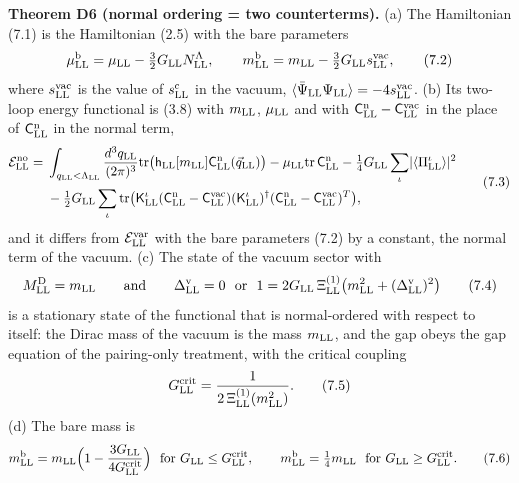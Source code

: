 \documentclass[
  10pt,
]{article}
\begin{document}
\textbf{Theorem D6 (normal ordering = two counterterms).} (a) The
Hamiltonian (7.1) is the Hamiltonian (2.5) with the bare parameters
\[\mu^{\rm b}_{\rm LL}=\mu_{\rm LL}-\tfrac32G_{\rm LL}N^\Lambda_{\rm LL},\qquad m^{\rm b}_{\rm LL}=m_{\rm LL}-\tfrac32G_{\rm LL}s^{\rm vac}_{\rm LL},\tag{7.2}\]
where \(s^{\rm vac}_{\rm LL}\) is the value of \(s^{\rm c}_{\rm LL}\) in
the vacuum,
\(\langle\bar\Psi_{\rm LL}\Psi_{\rm LL}\rangle=-4s^{\rm vac}_{\rm LL}\).
(b) Its two-loop energy functional is (3.8) with \(m_{\rm LL}\),
\(\mu_{\rm LL}\) and with
\(\mathsf C^{\rm n}_{\rm LL}-\mathsf C^{\rm vac}_{\rm LL}\) in the place
of \(\mathsf C^{\rm n}_{\rm LL}\) in the normal term,
\[\begin{aligned}\mathcal E^{\rm no}_{\rm LL}={}&\int_{q_{\rm LL}<\Lambda_{\rm LL}}\frac{d^3q_{\rm LL}}{(2\pi)^3}\mathrm{tr}\big(\mathsf h_{\rm LL}[m_{\rm LL}]\mathsf C^{\rm n}_{\rm LL}(\vec q_{\rm LL})\big)-\mu_{\rm LL}\mathrm{tr}\,\mathsf C^{\rm n}_{\rm LL}
-\tfrac14G_{\rm LL}\sum_\iota\lvert\langle\Pi^\iota_{\rm LL}\rangle\rvert^2\\
&-\tfrac12G_{\rm LL}\sum_\iota\mathrm{tr}\big(\mathsf K^\iota_{\rm LL}(\mathsf C^{\rm n}_{\rm LL}-\mathsf C^{\rm vac}_{\rm LL})(\mathsf K^\iota_{\rm LL})^\dagger(\mathsf C^{\rm n}_{\rm LL}-\mathsf C^{\rm vac}_{\rm LL})^T\big),\end{aligned}\tag{7.3}\]
and it differs from \(\mathcal E^{\rm var}_{\rm LL}\) with the bare
parameters (7.2) by a constant, the normal term of the vacuum. (c) The
state of the vacuum sector with
\[M^{\rm D}_{\rm LL}=m_{\rm LL}\qquad\text{and}\qquad\Delta^{\rm v}_{\rm LL}=0\ \ \text{or}\ \ 1=2G_{\rm LL}\,\Xi^{(1)}_{\rm LL}\big(m_{\rm LL}^2+(\Delta^{\rm v}_{\rm LL})^2\big)\tag{7.4}\]
is a stationary state of the functional that is normal-ordered with
respect to itself: the Dirac mass of the vacuum is the mass
\(m_{\rm LL}\), and the gap obeys the gap equation of the pairing-only
treatment, with the critical coupling
\[G^{\rm crit}_{\rm LL}=\frac1{2\,\Xi^{(1)}_{\rm LL}(m_{\rm LL}^2)}.\tag{7.5}\]
(d) The bare mass is
\[m^{\rm b}_{\rm LL}=m_{\rm LL}\Big(1-\frac{3G_{\rm LL}}{4G^{\rm crit}_{\rm LL}}\Big)\ \ \text{for}\ G_{\rm LL}\le G^{\rm crit}_{\rm LL},\qquad
m^{\rm b}_{\rm LL}=\tfrac14m_{\rm LL}\ \ \text{for}\ G_{\rm LL}\ge G^{\rm crit}_{\rm LL}.\tag{7.6}\]
\end{document}
